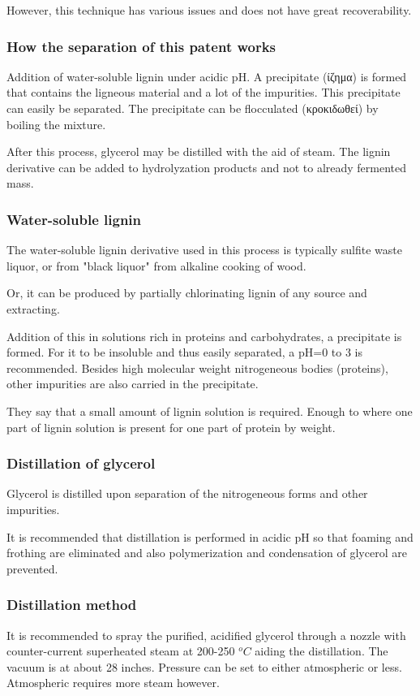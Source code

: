 \documentclass[11pt]{article}
\begin{document}
However, this technique has various issues and does not have great recoverability.
\subsubsection{How the separation of this patent works}
\label{sec:orgc116f73}
Addition of water-soluble lignin under acidic pH. A precipitate (ίζημα) is formed that contains the ligneous material and a lot of the impurities. This precipitate can easily be separated. The precipitate can be flocculated (κροκιδωθεί) by boiling the mixture.

After this process, glycerol may be distilled with the aid of steam. The lignin derivative can be added to hydrolyzation products and not to already fermented mass.
\subsubsection{Water-soluble lignin}
\label{sec:orgbae9499}
The water-soluble lignin derivative used in this process is typically sulfite waste liquor, or from "black liquor" from alkaline cooking of wood.

Or, it can be produced by partially chlorinating lignin of any source and extracting.

Addition of this in solutions rich in proteins and carbohydrates, a precipitate is formed. For it to be insoluble and thus easily separated, a pH=0 to 3 is recommended. Besides high molecular weight nitrogeneous bodies (proteins), other impurities are also carried in the precipitate.

They say that a small amount of lignin solution is required. Enough to where one part of lignin solution is present for one part of protein by weight.
\subsubsection{Distillation of glycerol}
\label{sec:orgb3a5ac9}
Glycerol is distilled upon separation of the nitrogeneous forms and other impurities.

It is recommended that distillation is performed in acidic pH so that foaming and frothing are eliminated and also polymerization and condensation of glycerol are prevented.
\subsubsection{Distillation method}
\label{sec:orgbb22377}
It is recommended to spray the purified, acidified glycerol through a nozzle with counter-current superheated steam at 200-250 \(^oC\) aiding the distillation. The vacuum is at about 28 inches. Pressure can be set to either atmospheric or less. Atmospheric requires more steam however.
\end{document}
